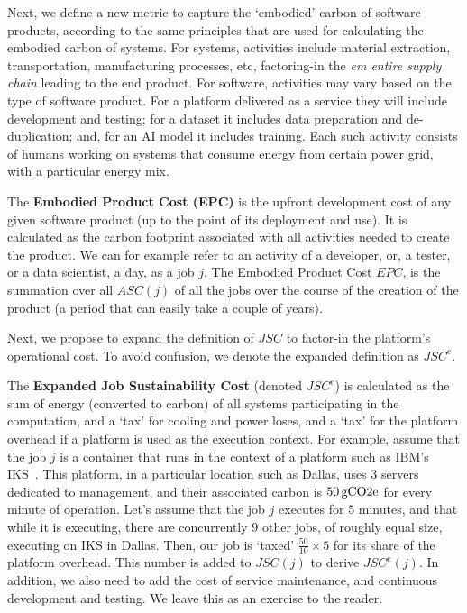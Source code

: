 {{        Next, we define a new metric to capture the `embodied' carbon of software products, according to the same principles that are used for calculating the embodied carbon of systems. For systems, activities include material extraction, transportation, manufacturing processes, etc, factoring-in the \textit{em entire supply chain} leading to the end product. For software, activities may vary based on the type of software product. For a platform delivered as a service they will include development and testing; for a dataset it includes data preparation and de-duplication; and, for an AI model it includes training. Each such activity consists of humans working on systems that consume energy from certain power grid, with a particular energy mix. 

        The \textbf{Embodied Product Cost (EPC)} is the upfront development cost of any given software product (up to the point of its deployment and use). It is calculated as the carbon footprint associated with all activities needed to create the product. We can for example refer to an activity of a developer, or, a tester, or a data scientist, a day, as a job $j$. The Embodied Product Cost $EPC$, is the summation over all $ASC \! \left ( j \right )$ of all the jobs over the course of the creation of the product (a period that can easily take a couple of years).  

        Next, we propose to expand the definition of $JSC$ to factor-in the platform's operational cost. To avoid confusion, we denote the expanded definition as $JSC^e$.

        The \textbf{Expanded Job Sustainability Cost} (denoted $JSC^e$) is calculated as the sum of energy (converted to carbon) of all systems participating in the computation, and a `tax' for cooling and power loses, and a `tax' for the platform overhead if a platform is used as the execution context. For example, assume that the job $j$ is a container that runs in the context of a platform such as IBM's IKS~\cite{IKS}. This platform, in a particular location such as Dallas, uses $3$ servers dedicated to management, and their associated carbon is $\unit[50]{gCO2e}$ for every minute of operation. Let's assume that the job $j$ executes for $5$ minutes, and that while it is executing, there are concurrently $9$ other jobs, of roughly equal size, executing on IKS in Dallas. Then, our job is `taxed' $\frac{50}{10} \times 5$ for its share of the platform overhead. This number is added to $JSC \! \left ( j \right )$ to derive $JSC^e \! \left ( j \right )$.  In addition, we also need to add the cost of service maintenance, and continuous development and testing. We leave this as an exercise to the reader. 

}}
